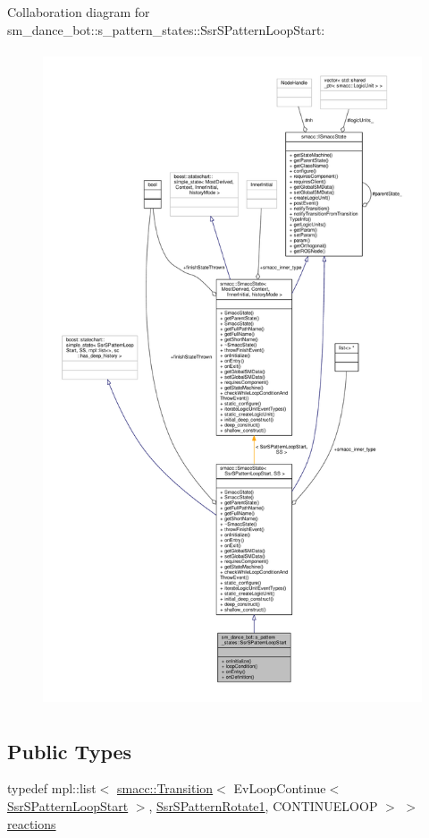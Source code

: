 Collaboration diagram for sm\+\_\+dance\+\_\+bot\+:\+:s\+\_\+pattern\+\_\+states\+:\+:Ssr\+S\+Pattern\+Loop\+Start\+:\nopagebreak
\begin{figure}[H]
\begin{center}
\leavevmode
\includegraphics[height=550pt]{structsm__dance__bot_1_1s__pattern__states_1_1SsrSPatternLoopStart__coll__graph}
\end{center}
\end{figure}
\subsection*{Public Types}
\begin{DoxyCompactItemize}
\item 
typedef mpl\+::list$<$ \hyperlink{classsmacc_1_1Transition}{smacc\+::\+Transition}$<$ Ev\+Loop\+Continue$<$ \hyperlink{structsm__dance__bot_1_1s__pattern__states_1_1SsrSPatternLoopStart}{Ssr\+S\+Pattern\+Loop\+Start} $>$, \hyperlink{structsm__dance__bot_1_1s__pattern__states_1_1SsrSPatternRotate1}{Ssr\+S\+Pattern\+Rotate1}, C\+O\+N\+T\+I\+N\+U\+E\+L\+O\+OP $>$ $>$ \hyperlink{structsm__dance__bot_1_1s__pattern__states_1_1SsrSPatternLoopStart_a971346bb1e8d06497e241e50029caa3a}{reactions}
\end{DoxyCompactItemize}
